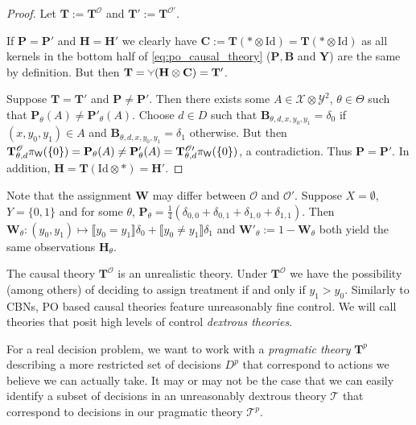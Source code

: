 \begin{proof}

Let $\mathbf{T}:=\mathbf{T}^{\mathscr{O}}$ and $\mathbf{T}':=\mathbf{T}^{\mathscr{O}'}$.

If $\mathbf{P}=\mathbf{P}'$ and $\mathbf{H}=\mathbf{H}'$ we clearly have $\mathbf{C}:=\mathbf{T}(*\otimes \mathrm{Id}) = \mathbf{T}(*\otimes \mathrm{Id})$ as all kernels in the bottom half of \ref{eq:po_causal_theory} ($\mathbf{P},\mathbf{B}$ and $\mathbf{Y}$) are the same by definition. But then $\mathbf{T} = \splitter{0.1}(\mathbf{H}\otimes\mathbf{C}) = \mathbf{T}'$.

Suppose $\mathbf{T}=\mathbf{T}'$ and $\mathbf{P}\neq \mathbf{P}'$. Then there exists some $A\in \mathcal{X}\otimes\mathcal{Y}^2$, $\theta\in \Theta$ such that $\mathbf{P}_\theta (A) \neq \mathbf{P}'_\theta(A)$. Choose $d\in D$ such that $\mathbf{B}_{\theta,d,x,y_0,y_1} = \delta_0$ if $(x,y_0,y_1)\in A$ and $\mathbf{B}_{\theta,d,x,y_0,y_1} = \delta_1$ otherwise. But then $\mathbf{T}^\mathscr{O}_{\theta,d} \pi_{\mathsf{W}} (\{0\})  =\mathbf{P}_\theta (A) \neq \mathbf{P}'_\theta(A) = \mathbf{T}^{\mathscr{O}\prime}_{\theta,d} \pi_{\mathsf{W}} (\{0\})$, a contradiction. Thus $\mathbf{P}=\mathbf{P}'$. In addition, $\mathbf{H} = \mathbf{T}(\mathrm{Id}\otimes *) = \mathbf{H}'$.
\end{proof}

Note that the assignment $\mathbf{W}$ may differ between $\mathscr{O}$ and $\mathscr{O}'$. Suppose $X=\emptyset$, $Y=\{0,1\}$ and for some $\theta$, $\mathbf{P}_\theta = \frac{1}{4}(\delta_{0,0}+\delta_{0,1}+\delta_{1,0}+\delta_{1,1})$. Then $\mathbf{W}_\theta:(y_0,y_1)\mapsto \llbracket y_0=y_1\rrbracket\delta_0 + \llbracket y_0\neq y_1\rrbracket \delta_1$ and $\mathbf{W}'_\theta := 1-\mathbf{W}_\theta$ both yield the same observations $\mathbf{H}_\theta$.

The causal theory $\mathbf{T}^{\mathscr{O}}$ is an unrealistic theory. Under $\mathbf{T}^{\mathscr{O}}$ we have the possibility (among others) of deciding to assign treatment if and only if $y_1 > y_0$. Similarly to CBNs, PO based causal theories feature unreasonably fine control. We will call theories that posit high levels of control \emph{dextrous theories}.

For a real decision problem, we want to work with a \emph{pragmatic theory} $\mathbf{T}^p$ describing a more restricted set of decisions $D^p$ that correspond to actions we believe we can actually take. It may or may not be the case that we can easily identify a subset of decisions in an unreasonably dextrous theory $\mathscr{T}$ that correspond to decisions in our pragmatic theory $\mathscr{T}^p$.

